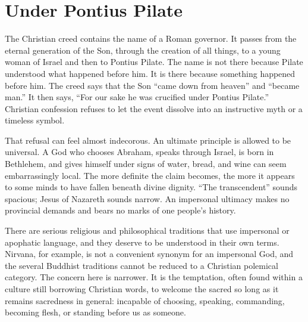 \section{Under Pontius Pilate}

The Christian creed contains the name of a Roman governor. It passes from the eternal generation of the Son, through the creation of all things, to a young woman of Israel and then to Pontius Pilate. The name is not there because Pilate understood what happened before him. It is there because something happened before him. The creed says that the Son ``came down from heaven'' and ``became man.'' It then says, ``For our sake he was crucified under Pontius Pilate.'' Christian confession refuses to let the event dissolve into an instructive myth or a timeless symbol.

That refusal can feel almost indecorous. An ultimate principle is allowed to be universal. A God who chooses Abraham, speaks through Israel, is born in Bethlehem, and gives himself under signs of water, bread, and wine can seem embarrassingly local. The more definite the claim becomes, the more it appears to some minds to have fallen beneath divine dignity. ``The transcendent'' sounds spacious; Jesus of Nazareth sounds narrow. An impersonal ultimacy makes no provincial demands and bears no marks of one people's history.

There are serious religious and philosophical traditions that use impersonal or apophatic language, and they deserve to be understood in their own terms. Nirvana, for example, is not a convenient synonym for an impersonal God, and the several Buddhist traditions cannot be reduced to a Christian polemical category. The concern here is narrower. It is the temptation, often found within a culture still borrowing Christian words, to welcome the sacred so long as it remains sacredness in general: incapable of choosing, speaking, commanding, becoming flesh, or standing before us as someone.

